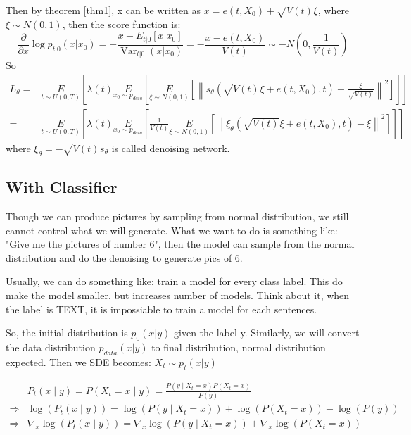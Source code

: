 \documentclass{article}
\begin{document}
Then by theorem \ref{thm1}, x can be written as $x=e(t, X_0)+\sqrt{V(t)}\xi$, where $\xi\sim N(0, 1)$, then the score function is:
\begin{equation}
    \frac{\partial}{\partial x} \log p_{t | 0}\left(x | x_{0}\right)=-\frac{x-E_{t | 0}\left[x | x_{0}\right]}{\operatorname{Var}_{t | 0}\left(x | x_{0}\right)}=-\frac{x-e(t, X_0)}{V(t)}\sim -N\left(0, \frac{1}{V(t)}\right)
\end{equation}
So
\begin{equation}
\begin{aligned}
    L_\theta=&\underset{t\sim U(0,T)}{E}\left[\lambda (t)\underset{x_0\sim p_{data}}{E}\left[\underset{\xi\sim N(0, 1)}{E}\left[\left\|s_\theta\left(\sqrt{V(t)}\xi+e(t, X_0), t\right) + \frac{\xi}{\sqrt{V(t)}}\right\|^2\right]\right]\right]\\
    =&\underset{t\sim U(0,T)}{E}\left[\lambda (t)\underset{x_0\sim p_{data}}{E}\left[\frac{1}{V(t)}\underset{\xi\sim N(0, 1)}{E}\left[\left\|\xi_\theta\left(\sqrt{V(t)}\xi+e(t, X_0), t\right)-\xi\right\|^2\right]\right]\right]
\end{aligned}    
\end{equation}
where $\xi_\theta = -\sqrt{V(t)}s_\theta$ is called denoising network.

\subsection{With Classifier}
Though we can produce pictures by sampling from normal distribution, we still cannot control what we will generate. What we want to do is something like:
"Give me the pictures of number 6", then the model can sample from the normal distribution and do the denoising to generate pics of 6. 

Usually, we can do something like: train a model for every class label. This do make the model smaller, but increases number of models. 
Think about it, when the label is TEXT, it is impossiable to train a model for each sentences. 

So, the initial distribution is $p_0(x|y)$ given the label y. Similarly, we will convert the data distribution $p_{data}(x|y)$ to final distribution, normal distribution expected.
Then we SDE becomes: $X_t \sim p_t(x|y)$


\begin{equation}
    \begin{aligned}
    & P_{t}(x \mid y)=P\left(X_{t}=x \mid y\right)=\frac{P\left(y \mid X_{t}=x\right) P\left(X_{t}=x\right)}{P(y)} \\
    \Rightarrow & \log \left(P_{t}(x \mid y)\right)=\log \left(P\left(y \mid X_{t}=x\right)\right)+\log \left(P\left(X_{t}=x\right)\right)-\log (P(y)) \\
    \Rightarrow & \nabla_{x} \log \left(P_{t}(x \mid y)\right)=\nabla_{x} \log \left(P\left(y \mid X_{t}=x\right)\right)+\nabla_{x} \log \left(P\left(X_{t}=x\right)\right)
    \end{aligned}
\end{equation}
    
\end{document}
